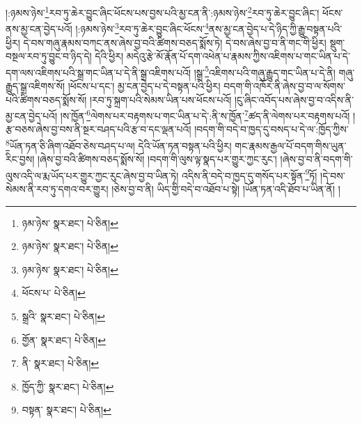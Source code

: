 །:ཉམས་ཉེས་\footnote{ཉམ་ཉེས་  སྣར་ཐང་།  པེ་ཅིན། }རབ་ཏུ་ཆེར་བྱུང་ཞིང་ཕོངས་པས་བྱས་པའི་མྱ་ངན་ནི་:ཉམས་ཉེས་\footnote{ཉམ་ཉེས་  སྣར་ཐང་།  པེ་ཅིན། }རབ་ཏུ་ཆེར་བྱུང་ཞིང་། ཕོངས་ནས་མྱ་ངན་བྱེད་པའོ། །:ཉམས་ཉེས་\footnote{ཉམ་ཉེས་  སྣར་ཐང་།  པེ་ཅིན། }རབ་ཏུ་ཆེར་བྱུང་ཞིང་ཕོངས་\footnote{ཕོངས་པ་  པེ་ཅིན། }ནས་མྱ་ངན་བྱེད་པ་དེ་ཉིད་ཀྱི་རྒྱུ་བསྟན་པའི་ཕྱིར། དེ་བས་གཞུ་རྣམས་བཀང་ནས་ཞེས་བྱ་བའི་ཚིགས་བཅད་སྨོས་ཏེ། དེ་བས་ཞེས་བྱ་བ་ནི་གང་གི་ཕྱིར། སྡུག་བསྔལ་རབ་ཏུ་བྱུང་བ་ཉིད་དེ། དེའི་ཕྱིར། མདེའུ་རྩེ་མོ་རྣོན་པོ་དག་འཕེན་པ་རྣམས་ཀྱིས་འཇིགས་པ་གང་ཡིན་པ་དེ་དག་ལས་འཇིགས་པའི་སྒྲ་གང་ཡིན་པ་དེ་ནི་སྒྲ་འཇིགས་པའོ། །སྒྲ་\footnote{སྒྲའི་  སྣར་ཐང་།  པེ་ཅིན། }འཇིགས་པའི་གཞུ་རྒྱུད་གང་ཡིན་པ་དེ་ནི། གཞུ་རྒྱུད་སྒྲ་འཇིགས་སོ། །ཕོངས་པ་དང་། མྱ་ངན་བྱེད་པ་དེ་བསྟན་པའི་ཕྱིར། བདག་གི་འཁོར་ནི་ཞེས་བྱ་བ་ལ་སོགས་པའི་ཚིགས་བཅད་སྨོས་སོ། །རབ་ཏུ་སྐྲག་པའི་སེམས་ཡིན་པས་ཕོངས་པའོ། །ངུ་ཞིང་འབོད་པས་ཞེས་བྱ་བ་འདིས་ནི་མྱ་ངན་བྱེད་པའོ། །ས་ཁྱོན་\footnote{གྱོན་  སྣར་ཐང་།  པེ་ཅིན། }ལེགས་པར་བརྟགས་པ་གང་ཡིན་པ་དེ་:ནི་ས་ཁྱོན་\footnote{ནི་  སྣར་ཐང་།  པེ་ཅིན། }ཚད་ནི་ལེགས་པར་བརྟགས་པའོ། །རྩ་བཅས་ཞེས་བྱ་བས་ནི་སྔར་བཤད་པའི་རྩ་བ་དང་ལྡན་པའོ། །བདག་གི་བདེ་བ་ཁྱད་དུ་བསད་པ་དེ་ལ་:ཁྱོད་ཀྱིས་\footnote{ཁྱོད་ཀྱི་  སྣར་ཐང་།  པེ་ཅིན། }ཡོན་ཏན་ཅི་ཞིག་འཐོབ་ཅེས་བཤད་པ་ལ། དེའི་ཡོན་ཏན་བསྟན་པའི་ཕྱིར། གང་རྣམས་རྒྱལ་པོ་བདག་གིས་ཡུན་རིང་བྱས། །ཞེས་བྱ་བའི་ཚིགས་བཅད་སྨོས་སོ། །བདག་གི་ལུས་ལྟ་སྣད་པར་གྱུར་ཀྱང་རུང་། །ཞེས་བྱ་བ་ནི་བདག་གི་ལུས་འདི་ལ་རྨ་ཡོད་པར་གྱུར་ཀྱང་རུང་ཞེས་བྱ་བ་ཡིན་ཏེ། འདིས་ནི་བདེ་བ་ཁྱད་དུ་གསོད་པར་སྟོན་\footnote{བསྟན་  སྣར་ཐང་།  པེ་ཅིན། }ཏོ། །དེ་བས་སེམས་ནི་རབ་ཏུ་དགའ་བར་གྱུར། །ཅེས་བྱ་བ་ནི། ཡིད་གྱི་བདེ་བ་འཐོབ་པ་སྟེ། །ཡོན་ཏན་འདི་ཐོབ་པ་ཡིན་ནོ། །
